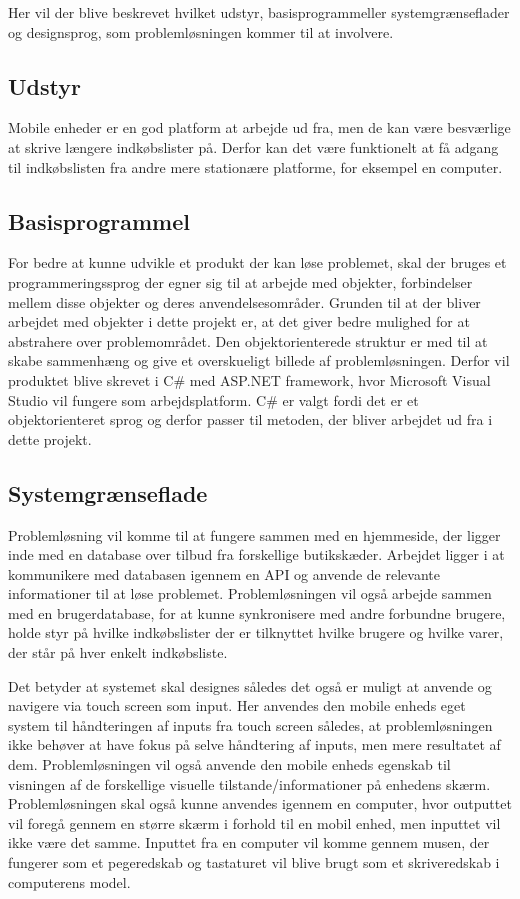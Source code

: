 Her vil der blive beskrevet hvilket udstyr, basisprogrammeller systemgrænseflader og designsprog, som problemløsningen kommer til at involvere.

\subsection{Udstyr}
Mobile enheder er en god platform at arbejde ud fra, men de kan være besværlige at skrive længere indkøbslister på. Derfor kan det være funktionelt at få adgang til indkøbslisten fra andre mere stationære platforme, for eksempel en computer.

\subsection{Basisprogrammel}
For bedre at kunne udvikle et produkt der kan løse problemet, skal der bruges et programmeringssprog der egner sig til at arbejde med objekter, forbindelser mellem disse objekter og deres anvendelsesområder. Grunden til at der bliver arbejdet med objekter i dette projekt er, at det giver bedre mulighed for at abstrahere over problemområdet. Den objektorienterede struktur er med til at skabe sammenhæng og give et overskueligt billede af problemløsningen. Derfor vil produktet blive skrevet i C\# med ASP.NET framework, hvor Microsoft Visual Studio vil fungere som arbejdsplatform. C\# er valgt fordi det er et objektorienteret sprog og derfor passer til metoden, der bliver arbejdet ud fra i dette projekt.

\subsection{Systemgrænseflade}
Problemløsning vil komme til at fungere sammen med en hjemmeside, der ligger inde med en database over tilbud fra forskellige butikskæder. Arbejdet ligger i at kommunikere med databasen igennem en API og anvende de relevante informationer til at løse problemet. Problemløsningen vil også arbejde sammen med en brugerdatabase, for at kunne synkronisere med andre forbundne brugere, holde styr på hvilke indkøbslister der er tilknyttet hvilke brugere og hvilke varer, der står på hver enkelt indkøbsliste. 

Det betyder at systemet skal designes således det også er muligt at anvende og navigere via touch screen som input. Her anvendes den mobile enheds eget system til håndteringen af inputs fra touch screen således, at problemløsningen ikke behøver at have fokus på selve håndtering af inputs, men mere resultatet af dem. Problemløsningen vil også anvende den mobile enheds egenskab til visningen af de forskellige visuelle tilstande/informationer på enhedens skærm.
Problemløsningen skal også kunne anvendes igennem en computer, hvor outputtet vil foregå gennem en større skærm i forhold til en mobil enhed, men inputtet vil ikke være det samme. Inputtet fra en computer vil komme gennem musen, der fungerer som et pegeredskab og tastaturet vil blive brugt som et skriveredskab i computerens model.

